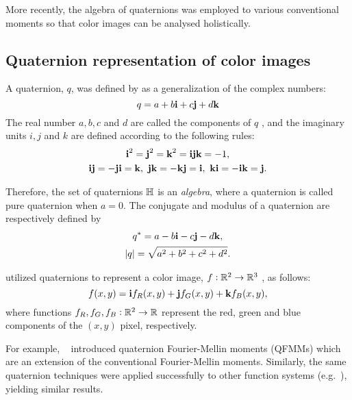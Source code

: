 More recently, the algebra of quaternions was employed to various conventional moments so that color images can be analysed holistically.

\subsection{Quaternion representation of color images}

A quaternion, $q$, was defined by \citeauthor{Hamilton} \cite{Hamilton} as a generalization of the complex numbers: 
\[
	q = a+b\textbf{i} +c\textbf{j}+d\textbf{k}
\]
The real number $a , b , c$ and $d$ are called the components of $q$ , and the imaginary units $i , j$ and $k$ are defined according to the following rules:
\[
\begin{gathered}
	\textbf{i}^2 = \textbf{j}^2 = \textbf{k}^2 = \textbf{i}\textbf{j}\textbf{k} = -1,\\
	\textbf{i}\textbf{j} = -\textbf{j}\textbf{i} = \textbf{k},\ \textbf{j}\textbf{k} = -\textbf{k}\textbf{j} = \textbf{i},\ \textbf{k}\textbf{i} = -\textbf{i}\textbf{k} = \textbf{j}.
\end{gathered}
\]

Therefore, the set of quaternions $\mathbb{H}$ is an \textit{algebra}, where a quaternion is called pure quaternion when $a=0$. 
The conjugate and modulus of a quaternion are respectively defined by 
\[
\begin{gathered}
q^* = a-b\textbf{i}-c\textbf{j}-d\textbf{k}, \\
|q| = \sqrt{a^2+b^2+c^2+d^2}.
\end{gathered}
\]

\citeauthor{EllSangwine} \cite{EllSangwine} utilized quaternions to represent a color image, $f: \mathbb{R}^2\to\mathbb{R}^3$ , as follows:
\[
f(x,y) = \textbf{i} f_R(x,y) + \textbf{j} f_G(x,y) + \textbf{k} f_B(x,y),
\]
where functions $f_R , f_G, f_B:\mathbb{R}^2\to\mathbb{R}$ represent the red, green and blue components of the $(x,y)$ pixel, respectively.


For example, \citeauthor{qfmm}~\cite{qfmm} introduced quaternion Fourier-Mellin moments (QFMMs) which are an extension of the conventional Fourier-Mellin moments. Similarly, the same quaternion techniques were applied successfully to other function systems (e.g.~\cite{bessel-fourier, chebyshev-fourier}), yielding similar results.

